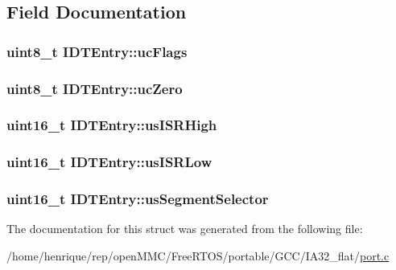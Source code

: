 \subsection{Field Documentation}
\hypertarget{structIDTEntry_abf8d8ca4d1da518ad0ec4d34a68c8abf}{
\subsubsection[{uc\-Flags}]{\setlength{\rightskip}{0pt plus 5cm}uint8\-\_\-t I\-D\-T\-Entry\-::uc\-Flags}}\label{structIDTEntry_abf8d8ca4d1da518ad0ec4d34a68c8abf}
\hypertarget{structIDTEntry_a135bfe3f884d81face00fbef7440c957}{
\subsubsection[{uc\-Zero}]{\setlength{\rightskip}{0pt plus 5cm}uint8\-\_\-t I\-D\-T\-Entry\-::uc\-Zero}}\label{structIDTEntry_a135bfe3f884d81face00fbef7440c957}
\hypertarget{structIDTEntry_a6e0e6884bb02831eb83cc06c101d8c57}{
\subsubsection[{us\-I\-S\-R\-High}]{\setlength{\rightskip}{0pt plus 5cm}uint16\-\_\-t I\-D\-T\-Entry\-::us\-I\-S\-R\-High}}\label{structIDTEntry_a6e0e6884bb02831eb83cc06c101d8c57}
\hypertarget{structIDTEntry_a697339bc290ebc873b65697756b23d1f}{
\subsubsection[{us\-I\-S\-R\-Low}]{\setlength{\rightskip}{0pt plus 5cm}uint16\-\_\-t I\-D\-T\-Entry\-::us\-I\-S\-R\-Low}}\label{structIDTEntry_a697339bc290ebc873b65697756b23d1f}
\hypertarget{structIDTEntry_a6f409962007e9536b0fb17608918359e}{
\subsubsection[{us\-Segment\-Selector}]{\setlength{\rightskip}{0pt plus 5cm}uint16\-\_\-t I\-D\-T\-Entry\-::us\-Segment\-Selector}}\label{structIDTEntry_a6f409962007e9536b0fb17608918359e}


The documentation for this struct was generated from the following file\-:\begin{DoxyCompactItemize}
\item 
/home/henrique/rep/open\-M\-M\-C/\-Free\-R\-T\-O\-S/portable/\-G\-C\-C/\-I\-A32\-\_\-flat/\hyperlink{GCC_2IA32__flat_2port_8c}{port.\-c}\end{DoxyCompactItemize}
